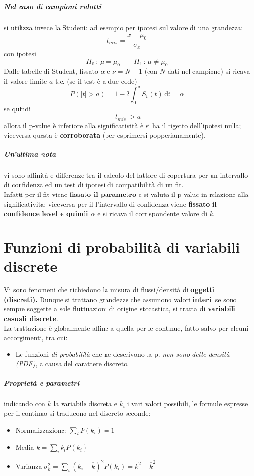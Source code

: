 \documentclass[10pt, oneside]{book}
\newcommand{\integral}[4]{\int_{#1}^{#2} #3 \, \mathrm{d}#4}
\begin{document}
\paragraph{Nel caso di campioni ridotti} si utilizza invece la Student: ad esempio per ipotesi sul valore di una grandezza:
\[t_{mis} = \frac{\overline{x} - \mu_0}{\sigma_{\overline{x}}}\]
con ipotesi
\[H_0 \, : \, \mu = \mu_0 \qquad H_1 \, : \, \mu \neq \mu_0\]
Dalle tabelle di Student, fissato $\alpha$ e $\nu = N-1$ (con $N$ dati nel campione) si ricava il valore limite $a$ t.c. (se il test è a due code)
\[P(|t| > a) = 1 - 2 \integral{0}{a}{S_\nu (t)}{t} = \alpha\]
se quindi
\[|t_{mis}| > a\]
allora il p-value è inferiore alla significatività è si ha il rigetto dell'ipotesi nulla; viceversa questa è \textbf{corroborata} (per esprimersi popperianamente).

\paragraph{Un'ultima nota} vi sono affinità e differenze tra il calcolo del fattore di copertura per un intervallo di confidenza ed un test di ipotesi di compatibilità di un fit.\\
Infatti per il fit viene \textbf{fissato il parametro} e si valuta il p-value in relazione alla significatività; viceversa per il l'intervallo di confidenza viene \textbf{fissato il confidence level e quindi $\alpha$} e si ricava il corrispondente valore di $k$.



\chapter{Funzioni di probabilità di variabili discrete}
Vi sono fenomeni che richiedono la misura di flussi/densità di \textbf{oggetti (discreti).} Dunque si trattano grandezze che assumono valori \textbf{interi}: se sono sempre soggette a sole fluttuazioni di origine stocastica, si tratta di \textbf{variabili casuali discrete}.\\
La trattazione è globalmente affine a quella per le continue, fatto salvo per alcuni accorgimenti, tra cui:
\begin{itemize}
\item Le funzioni \textit{di probabilità} che ne descrivono la p. \textit{non sono delle densità (PDF)}, a causa del carattere discreto.
\end{itemize}
\paragraph{Proprietà e parametri} indicando con $k$ la variabile discreta e $k_i$ i vari valori possibili, le formule espresse per il continuo si traducono nel discreto secondo:
\begin{itemize}
\item Normalizzazione: $\displaystyle \sum_i P(k_i) = 1$
\item Media $\displaystyle \overline{k} = \sum_i k_i P(k_i)$
\item Varianza $\displaystyle \sigma_k^2 = \sum_i (k_i - \overline{k})^2 P(k_i) = \overline{k^2} - \overline{k}^2$
\end{itemize}
\end{document}
